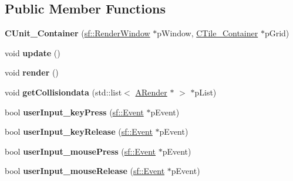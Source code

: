 \subsection*{Public Member Functions}
\begin{DoxyCompactItemize}
\item 
\hypertarget{classCUnit__Container_a744405ccd2f0a8764d527e9d549b59ef}{{\bfseries C\-Unit\-\_\-\-Container} (\hyperlink{classsf_1_1RenderWindow}{sf\-::\-Render\-Window} $\ast$p\-Window, \hyperlink{classCTile__Container}{C\-Tile\-\_\-\-Container} $\ast$p\-Grid)}\label{classCUnit__Container_a744405ccd2f0a8764d527e9d549b59ef}

\item 
\hypertarget{classCUnit__Container_ac9f8730abcc32d9d1d98b32667e0df61}{void {\bfseries update} ()}\label{classCUnit__Container_ac9f8730abcc32d9d1d98b32667e0df61}

\item 
\hypertarget{classCUnit__Container_a681e14cd1a0745be8f454eff21a07c6b}{void {\bfseries render} ()}\label{classCUnit__Container_a681e14cd1a0745be8f454eff21a07c6b}

\item 
\hypertarget{classCUnit__Container_abe9cc4df18bbd9c60f76360c03b59627}{void {\bfseries get\-Collisiondata} (std\-::list$<$ \hyperlink{classARender}{A\-Render} $\ast$ $>$ $\ast$p\-List)}\label{classCUnit__Container_abe9cc4df18bbd9c60f76360c03b59627}

\item 
\hypertarget{classCUnit__Container_a83d19fd4d473972bc2720d571c6bfb73}{bool {\bfseries user\-Input\-\_\-key\-Press} (\hyperlink{classsf_1_1Event}{sf\-::\-Event} $\ast$p\-Event)}\label{classCUnit__Container_a83d19fd4d473972bc2720d571c6bfb73}

\item 
\hypertarget{classCUnit__Container_ad716ac99e85768e9da638fa971e7f5b0}{bool {\bfseries user\-Input\-\_\-key\-Release} (\hyperlink{classsf_1_1Event}{sf\-::\-Event} $\ast$p\-Event)}\label{classCUnit__Container_ad716ac99e85768e9da638fa971e7f5b0}

\item 
\hypertarget{classCUnit__Container_a2b3a12f90500e7b67413e772ece36cb2}{bool {\bfseries user\-Input\-\_\-mouse\-Press} (\hyperlink{classsf_1_1Event}{sf\-::\-Event} $\ast$p\-Event)}\label{classCUnit__Container_a2b3a12f90500e7b67413e772ece36cb2}

\item 
\hypertarget{classCUnit__Container_a3704686b7aecda14352236aed489fc25}{bool {\bfseries user\-Input\-\_\-mouse\-Release} (\hyperlink{classsf_1_1Event}{sf\-::\-Event} $\ast$p\-Event)}\label{classCUnit__Container_a3704686b7aecda14352236aed489fc25}

\end{DoxyCompactItemize}
